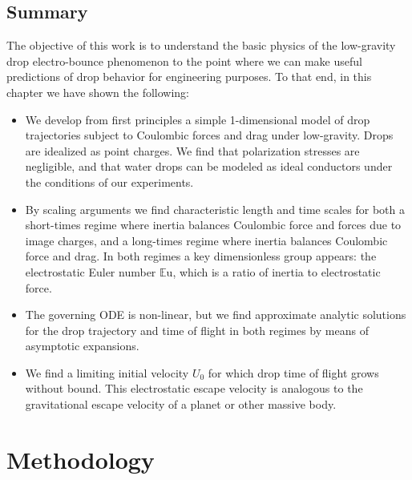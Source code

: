 \documentclass[12pt,a4paper,oneside]{book}
\begin{document}
\section{Summary}
The objective of this work is to understand the basic physics of the low-gravity drop electro-bounce phenomenon to the point where we can make useful predictions of drop behavior for engineering purposes. To that end, in this chapter we have shown the following:
\begin{itemize}
\item We develop from first principles a simple 1-dimensional model of drop trajectories subject to Coulombic forces and drag under low-gravity. Drops are idealized as point charges. We find that polarization stresses are negligible, and that water drops can be modeled as ideal conductors under the conditions of our experiments.
\item By scaling arguments we find characteristic length and time scales for both a short-times regime where inertia balances Coulombic force and forces due to image charges, and a long-times regime where inertia balances Coulombic force and drag. In both regimes a key dimensionless group appears: the electrostatic Euler number $\mathbb{E}\mbox{u}$, which is a ratio of inertia to electrostatic force. 
\item The governing ODE is non-linear, but we find approximate analytic solutions for the drop trajectory and time of flight in both regimes by means of asymptotic expansions.
\item We find a limiting initial velocity $U_0$ for which drop time of flight grows without bound. This electrostatic escape velocity is analogous to the gravitational escape velocity of a planet or other massive body. 
\end{itemize} 

\chapter{Methodology}
\end{document}
